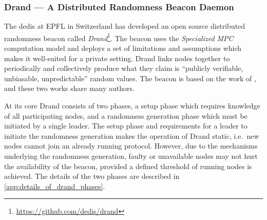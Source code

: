 \subsubsection{Drand --- A Distributed Randomness Beacon Daemon}%
\label{sub:drand_a_distributed_randomness_beacon_daemon}
The \gls{dedis} at EPFL in Switzerland has developed an open source distributed randomness beacon called \textit{Drand}\footnote{\url{https://github.com/dedis/drand}}.
The beacon uses the \textit{Specialized MPC} computation model and deploys a set of limitations and assumptions which makes it well-suited for a private setting.
Drand links nodes together to periodically and collectively produce what they claim is \enquote{publicly verifiable, unbiasable, unpredictable} random values. The beacon is based on the work of \citet{syta2017scalable}, and these two works share many authors.

At its core Drand consists of two phases, a setup phase which requires knowledge of all participating nodes, and a randomness generation phase which must be initiated by a single leader.
The setup phase and requirements for a leader to initiate the randomness generation makes the operation of Drand static, i.e.\ new nodes cannot join an already running protocol.
However, due to the mechanisms underlying the randomness generation, faulty or unavailable nodes may not hurt the availability of the beacon, provided a defined threshold of running nodes is achieved.
The details of the two phases are described in \vref{app:details_of_drand_phases}. 
